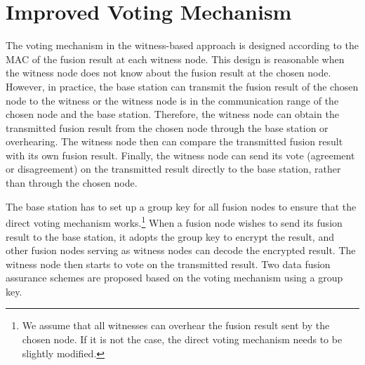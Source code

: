 \documentclass[12pt, onecolumn, draftcls]{IEEEtran}
\begin{document}
\section{Improved Voting Mechanism}
\label{sec:voting} The voting mechanism in the witness-based
approach is designed according to the MAC of the fusion result at
each witness node. This design is reasonable when the witness node
does not know about the fusion result at the chosen node. However,
in practice, the base station can transmit the fusion result of the
chosen node to the witness or the witness node is in the
communication range of the chosen node and the base station.
Therefore, the witness node can obtain the transmitted fusion result
from the chosen node through the base station or overhearing. The
witness node then can compare the transmitted fusion result with its
own fusion result. Finally, the witness node can send its vote
(agreement or disagreement) on the transmitted result directly to
the base station, rather than through the chosen node.

The base station has to set up a group key for all fusion nodes to
ensure that the direct voting mechanism works.\footnote{We assume
that all witnesses can overhear the fusion result sent by the chosen
node. If it is not the case, the direct voting mechanism needs to be
slightly modified.}  When a fusion node wishes to send its fusion
result to the base station, it adopts the group key to encrypt the
result, and other fusion nodes serving as witness nodes can decode
the encrypted result. The witness node then starts to vote on the
transmitted result. Two data fusion assurance schemes are proposed
based on the voting mechanism using a group key.
\end{document}
